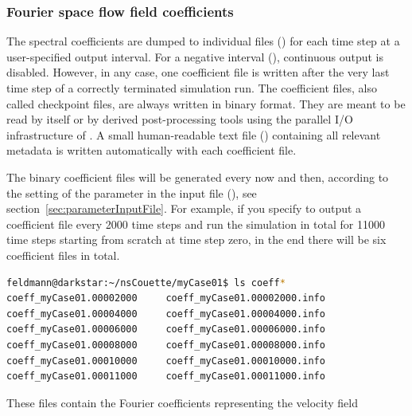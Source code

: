\documentclass[a4paper, 11pt, DIV=11]{scrartcl}
\begin{document}
\subsubsection{Fourier space flow field coefficients}
\label{sec:ioCoeff}

\par
The spectral coefficients are dumped to individual files () for each time
step at a user-specified output interval. For a negative interval (), 
continuous output is disabled. However, in any case, one coefficient file is written
after the very last time step of a correctly terminated simulation run. The coefficient
files, also called checkpoint files, are always written in binary  format.
They are meant to be read by \nsc itself or by derived post-processing tools using the
parallel I/O infrastructure of \nsc. A small human-readable text file ()
containing all relevant metadata is written automatically with each coefficient file.
\par
The binary coefficient files will be generated every now and then, according to the
setting of the  parameter in the input file (),
see section~\ref{sec:parameterInputFile}. For example, if you specify to output a
coefficient file every \num{2000} time steps and run the simulation in total for
\num{11000} time steps starting from scratch at time step zero, in the end there
will be six coefficient files in total.
\begin{lstlisting}[language=bash]
feldmann@darkstar:~/nsCouette/myCase01$ ls coeff*
coeff_myCase01.00002000     coeff_myCase01.00002000.info
coeff_myCase01.00004000     coeff_myCase01.00004000.info
coeff_myCase01.00006000     coeff_myCase01.00006000.info
coeff_myCase01.00008000     coeff_myCase01.00008000.info
coeff_myCase01.00010000     coeff_myCase01.00010000.info
coeff_myCase01.00011000     coeff_myCase01.00011000.info
\end{lstlisting}
These files contain the Fourier coefficients representing the velocity field
\end{document}
